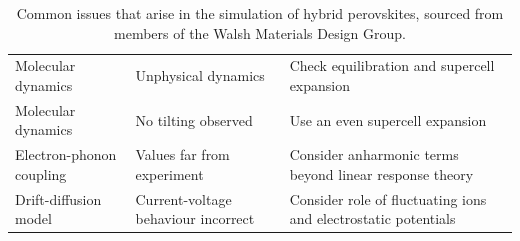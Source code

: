 \begin{landscape}
\begin{table}[tb]
\begin{tabular}{p{5cm}p{7cm}p{10cm}}
Molecular dynamics & Unphysical dynamics & Check equilibration and supercell expansion \\
Molecular dynamics & No tilting observed & Use an even supercell expansion \\
Electron-phonon coupling & Values far from  experiment & Consider anharmonic terms  beyond linear response \newline theory   \\
Drift-diffusion model & Current-voltage behaviour incorrect & Consider role of fluctuating ions and electrostatic \newline potentials \\
\bottomrule
\end{tabular}
\caption[Common issues that arise in the simulation of hybrid perovskites]{\label{tab:techsol} Common issues that arise in the simulation of hybrid perovskites, sourced from members of the Walsh Materials Design Group.
}
\end{table}
\end{landscape}